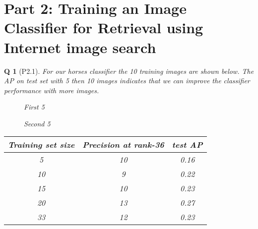 \documentclass[11pt]{article}
\theoremstyle{exo}
\newtheorem*{exercise}{Q}
\newcommand{\1}{\mathbf{1}}
\newcommand{\0}{\mathbf{0}}
\begin{document}
\section*{Part 2: Training an Image Classifier for Retrieval using Internet image search}
\begin{exercise}[P2.1]
	For our \textit{horses} classifier the 10 training images are shown below. The AP on test set with 5 then 10 images indicates that we can improve the classifier performance with more images.
	\begin{figure}[H]
		\caption{First 5}
		\centering
	\end{figure}

	\begin{figure}[H]
		\caption{Second 5}
		\centering
	\end{figure}

	\begin{table}[H]
		\centering
		\begin{tabular}{||c|c|c||}
		\hline
		Training set size & Precision at rank-36 & test AP\\
		\hline
		5 & 10 & 0.16\\
		10 & 9 & 0.22 \\
		15 & 10 & 0.23\\
		20 & {\color{Emerald}13} & 0.27\\
		33 & 12 & 0.23\\
		\hline
		\end{tabular}
	\end{table}
\end{exercise}
\end{document}
